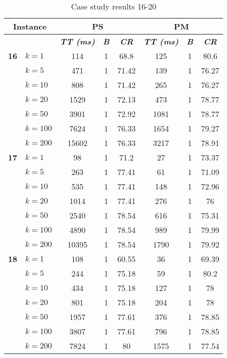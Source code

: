     \begin{table}[htbp]
    \caption{Case study results 16-20}
    \centering
    \begin{tabular}{|l|l|c|c|c|c|c|c|}
    \hline
    \multicolumn{ 2}{|c|}{\textbf{Instance}} & \multicolumn{ 3}{c|}{\textbf{PS}} & \multicolumn{ 3}{c|}{\textbf{PM}} \\ \hline
    \multicolumn{ 2}{|l|}{} & \textbf{\textit{TT (ms)}} & \textbf{\textit{B}} & \textbf{\textit{CR}} & \textbf{\textit{TT (ms)}} & \textbf{\textit{B}} & \textbf{\textit{CR}} \\ \hline
    \multicolumn{1}{|r|}{\textbf{16}} & $k=1$ & 114 & 1 & 68.8 & 125 & 1 & 80.6 \\ 
     & $k=5$ & 471 & 1 & 71.42 & 139 & 1 & 76.27 \\ 
     & $k=10$ & 808 & 1 & 71.42 & 265 & 1 & 76.27 \\ 
     & $k=20$ & 1529 & 1 & 72.13 & 473 & 1 & 78.77 \\ 
     & $k=50$ & 3901 & 1 & 72.92 & 1081 & 1 & 78.77 \\ 
     & $k=100$ & 7624 & 1 & 76.33 & 1654 & 1 & 79.27 \\ 
     & $k=200$ & 15602 & 1 & 76.33 & 3217 & 1 & 78.91 \\ \hline
    \multicolumn{1}{|r|}{\textbf{17}} & $k=1$ & 98 & 1 & 71.2 & 27 & 1 & 73.37 \\ 
     & $k=5$ & 263 & 1 & 77.41 & 61 & 1 & 71.09 \\ 
     & $k=10$ & 535 & 1 & 77.41 & 148 & 1 & 72.96 \\ 
     & $k=20$ & 1014 & 1 & 77.41 & 276 & 1 & 76 \\ 
     & $k=50$ & 2540 & 1 & 78.54 & 616 & 1 & 75.31 \\ 
     & $k=100$ & 4890 & 1 & 78.54 & 989 & 1 & 79.99 \\ 
     & $k=200$ & 10395 & 1 & 78.54 & 1790 & 1 & 79.92 \\ \hline
    \multicolumn{1}{|r|}{\textbf{18}} & $k=1$ & 108 & 1 & 60.55 & 36 & 1 & 69.39 \\ 
     & $k=5$ & 244 & 1 & 75.18 & 59 & 1 & 80.2 \\ 
     & $k=10$ & 434 & 1 & 75.18 & 127 & 1 & 78 \\ 
     & $k=20$ & 801 & 1 & 75.18 & 204 & 1 & 78 \\ 
     & $k=50$ & 1957 & 1 & 77.61 & 376 & 1 & 78.85 \\ 
     & $k=100$ & 3807 & 1 & 77.61 & 796 & 1 & 78.85 \\ 
     & $k=200$ & 7824 & 1 & 80 & 1575 & 1 & 77.54 \\ \hline

\end{tabular}
\end{table}
